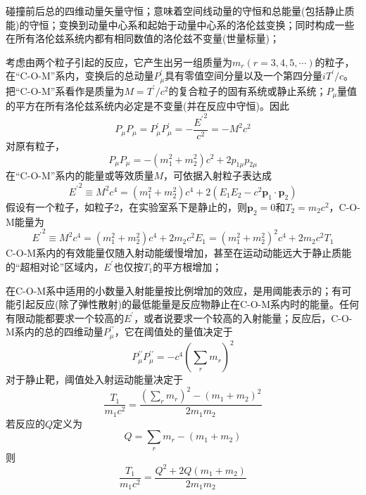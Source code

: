 \documentclass[11pt,a4paper]{article}
\renewcommand{\vec}[1]{\boldsymbol{#1}}
\begin{document}
碰撞前后总的四维动量矢量守恒；意味着空间线动量的守恒和总能量(包括静止质能)的守恒；变换到动量中心系和起始于动量中心系的洛伦兹变换；同时构成一些在所有洛伦兹系统内都有相同数值的洛伦兹不变量(世量标量)；

考虑由两个粒子引起的反应，它产生出另一组质量为$m_r (r = 3, 4, 5, \cdots)$的粒子，在“C-O-M”系内，变换后的总动量$P^{\prime}_{\mu}$具有零值空间分量以及一个第四分量$iT^{\prime}/c$。把“C-O-M”系看作是质量为$M=T^{\prime}/c^2$的复合粒子的固有系统或静止系统；$P_{\mu}$量值的平方在所有洛伦兹系统内必定是不变量(并在反应中守恒)。因此
\begin{equation}
P_{\mu} P_{\mu} = P^{\prime}_{\mu}P^{\prime}_{\mu} = -\frac{{E^{\prime}}^2}{c^2} = -M^2 c^2
\end{equation}
对原有粒子，
\begin{equation}
P_{\mu} P_{\mu} = -(m_1^2 +m_2^2) c^2 + 2p_{1\mu} p_{2\mu}
\end{equation}
在“C-O-M”系内的能量或等效质量$M$，可依据入射粒子表达成
\begin{equation}
{E^{\prime}}^2 \equiv M^2 c^4 = (m_1^2 +m_2^2) c^4 +2(E_1 E_2 -c^2 \vec{p}_1 \cdot \vec{p}_2 )
\end{equation}
假设有一个粒子，如粒子2，在实验室系下是静止的，则$\vec{p}_2 = 0$和$T_2 = m_2 c^2$，C-O-M能量为
\begin{equation}
{E^{\prime}}^2 \equiv M^2 c^4 = (m_1^2 +m_2^2) c^4 +2m_2 c^2 E_1 =  (m_1^2 +m_2^2)^2 c^4 +2m_2 c^2 T_1
\end{equation}
C-O-M系内的有效能量仅随入射动能缓慢增加，甚至在运动动能远大于静止质能的“超相对论”区域内，$E^{\prime}$也仅按$T_1$的平方根增加；

在C-O-M系中适用的小数量入射能量按比例增加的效应，是用阈能表示的；有可能引起反应(除了弹性散射)的最低能量是反应物静止在C-O-M系内时的能量。任何有限动能都要求一个较高的$E^{\prime}$，或者说要求一个较高的入射能量；反应后，C-O-M系内的总的四维动量$P_{\mu}^{\prime \prime}$，它在阈值处的量值决定于
\begin{equation}
P_{\mu}^{\prime \prime} P_{\mu}^{\prime \prime} = -c^4 \left(\sum_r m_r \right)^2 
\end{equation}
对于静止靶，阈值处入射运动能量决定于
\begin{equation}
\frac{T_1}{m_1 c^2} = \frac{\left(\sum\limits_r m_r \right)^2 -(m_1 +m_2)^2}{2m_1 m_2}
\end{equation}
若反应的$Q$定义为
\begin{equation}
Q  = \sum_r m_r -(m_1 +m_2)
\end{equation}
则
\begin{equation}
\frac{T_1}{m_1 c^2} = \frac{Q^2 +2Q(m_1 +m_2)}{2m_1 m_2}
\end{equation}
\end{document}
